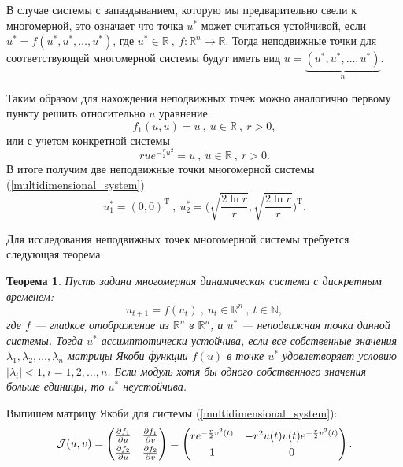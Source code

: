 \documentclass[10pt]{article}
\newtheorem{theorem}{Теорема}
\numberwithin{equation}{section}
\begin{document}
В случае системы с запаздыванием, которую мы предварительно свели к многомерной, это означает что точка \( u^* \) может считаться устойчивой, если \( u^* = f(u^*, u^*, \dots, u^*) \), где \( u^* \in \mathbb{R} \ , \ f: \mathbb{R}^n \to \mathbb{R} \). Тогда неподвижные точки для соответствующей многомерной системы будут иметь вид \( u = \underbrace{(u^*, u^*, \dots, u^*)}_n. \)

Таким образом для нахождения неподвижных точек можно аналогично первому пункту решить относительно \( u \) уравнение:
\[ f_1(u, u) = u \ , \ u \in \mathbb{R} \ , \ r > 0 , \]
или с учетом конкретной системы
\[ rue^{-\frac{r}{2}u^2} = u \ , \ u \in \mathbb{R} \ , \ r > 0 . \]
В итоге получим две неподвижные точки многомерной системы  (\ref{multidimensional_system})
\[ u_1^* = (0, 0)^\mathrm{T} \ , \ u_2^* = \bigg(\sqrt{\frac{2\ln r}{r}}, \sqrt{\frac{2\ln r}{r}}\bigg)^\mathrm{T} .\]

Для исследования неподвижных точек многомерной системы требуется следующая теорема:
\begin{theorem}
	Пусть задана многомерная динамическая система с дискретным временем:
	\[ u_{t+1}  = f(u_t) \ , \ u_t \in \mathbb{R}^n \ , \ t \in \mathbb{N} , \]
	где \( f \) --- гладкое отображение из \( \mathbb{R}^n \) в \( \mathbb{R}^n \), и \( u^* \) --- неподвижная точка данной системы. Тогда \( u^* \) ассимптотически устойчива, если все собственные значения \( \lambda_1, \lambda_2, \dots, \lambda_n \) матрицы Якоби функции \( f(u) \) в точке \( u^* \) удовлетворяет условию \( |\lambda_i| < 1, i = 1, 2, \dots, n \). Если модуль хотя бы одного собственного значения больше единицы, то \( u^* \) неустойчива.
\end{theorem}

Выпишем матрицу Якоби для системы (\ref{multidimensional_system}):
\begin{equation}
	\mathcal{J}(u,v) = \begin{pmatrix} \frac{\partial f_1}{\partial u} & \frac{\partial f_1}{\partial v} \smallskip\\  \frac{\partial f_2}{\partial u} & \frac{\partial f_2}{\partial v}\end{pmatrix} = \begin{pmatrix} re^{-\frac{r}{2} v^2(t)} & -r^2u(t)v(t)e^{-\frac{r}{2}v^2(t)} \smallskip\\ 1 & 0 \end{pmatrix}.
\end{equation}
\end{document}

